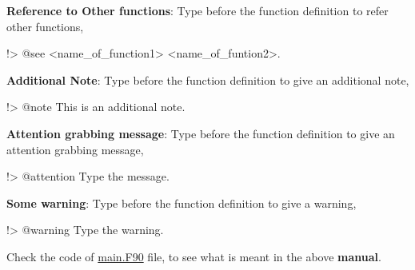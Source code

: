 {\bfseries{Reference to Other functions}}\+: Type before the function definition to refer other functions, \begin{DoxyVerb}!> @see <name_of_function1> <name_of_funtion2>.  \end{DoxyVerb}


{\bfseries{Additional Note}}\+: Type before the function definition to give an additional note, \begin{DoxyVerb}!> @note This is an additional note.  \end{DoxyVerb}


{\bfseries{Attention grabbing message}}\+: Type before the function definition to give an attention grabbing message, \begin{DoxyVerb}!> @attention Type the message.  \end{DoxyVerb}


{\bfseries{Some warning}}\+: Type before the function definition to give a warning, \begin{DoxyVerb}!> @warning Type the warning.  \end{DoxyVerb}


Check the code of \mbox{\hyperlink{main_8_f90}{main.\+F90}} file, to see what is meant in the above {\bfseries{manual}}. 